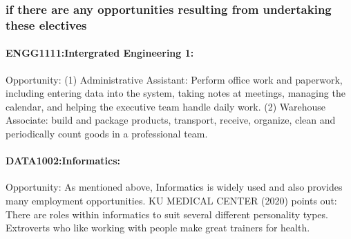 \documentclass[../draft.tex]{subfiles}
\begin{document}
\subsubsection{if there are any opportunities resulting from undertaking these electives}
\paragraph{ENGG1111:Intergrated Engineering 1:}
Opportunity: (1) Administrative Assistant: Perform office work and paperwork, including entering data into the system, taking notes at meetings, managing the calendar, and helping the executive team handle daily work. (2) Warehouse Associate: build and package products, transport, receive, organize, clean and periodically count goods in a professional team.
\paragraph{DATA1002:Informatics:}
Opportunity: As mentioned above, Informatics is widely used and also provides many employment opportunities. KU MEDICAL CENTER (2020) points out: There are roles within informatics to suit several different personality types. Extroverts who like working with people make great trainers for health.
\end{document}
